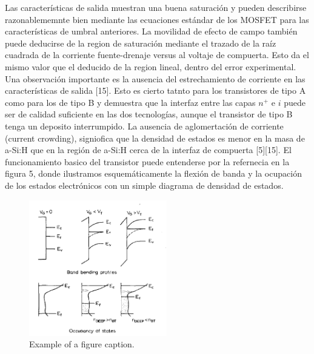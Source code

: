 \documentclass[conference]{IEEEtran}
\begin{document}
    Las características de salida muestran una buena saturación y pueden describirse
    razonablememnte bien mediante las ecuaciones estándar de los MOSFET para las características
    de umbral anteriores. La movilidad de efecto de campo también puede deducirse de la region 
    de saturación mediante el trazado de la raíz cuadrada de la corriente fuente-drenaje
    versus al voltaje de compuerta. Esto da el mismo valor que el deducido de la region lineal, dentro del 
    error experimental. 
    \\
    Una observación importante es la ausencia del estrechamiento de corriente en las
    características de salida [15]. Esto es cierto tatnto para los transistores de 
    tipo A como para los de tipo B y demuestra que la interfaz entre las capas $n^+$ e $i$
    puede ser de calidad suficiente en las dos tecnologías, aunque el transistor de tipo B 
    tenga un deposito interrumpido. La ausencia de aglomertación de corriente (current crowding),
    signiofica que la densidad de estados es menor en la masa de a-Si:H que en la región de a-Si:H
    cerca de la interfaz de compuerta [5][15].
    El funcionamiento basico del transistor puede entenderse por la refernecia en la figura 5, 
    donde ilustramos esquemáticamente la flexión de banda y la ocupación de los estados electrónicos
    con un simple diagrama de densidad de estados.


\begin{figure}[htbp]
    \centerline{\includegraphics[width=6.0cm]{img/imagen-5.png}}
    \caption{Example of a figure caption.}%
    \label{fig5}
\end{figure} 
    
\end{document}
